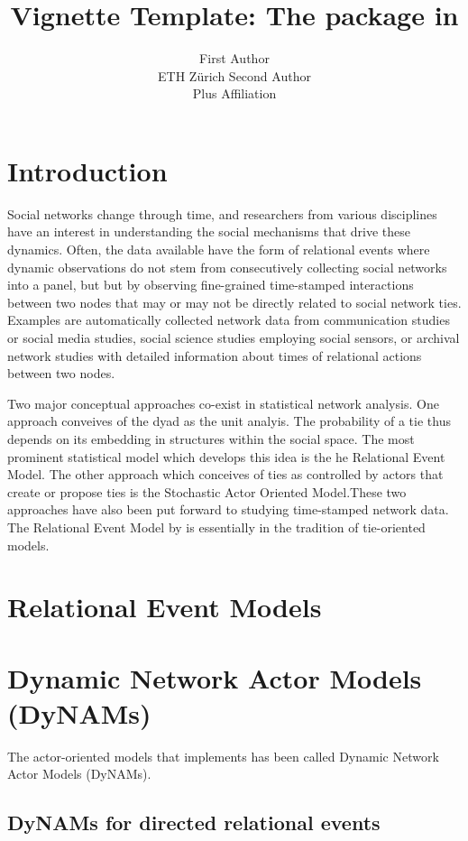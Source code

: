 \documentclass[article]{jss}
\author{First Author\\ETH Zürich
   \And Second Author\\Plus Affiliation}
\title{Vignette Template: The \pkg{goldfish} package in \proglang{R}}
\begin{document}


\justify
\section[Introduction]{Introduction} \label{sec:intro}


Social networks change through time, and researchers from various disciplines have an interest in understanding the social mechanisms that drive these dynamics. Often, the data available have the form of relational events where dynamic observations do not stem from consecutively collecting social networks into a panel, but but by observing fine-grained time-stamped interactions between two nodes that may or may not be directly related to social network ties. Examples are automatically collected network data from communication studies or social media studies, social science studies employing social sensors, or archival network studies with detailed information about times of relational actions between two nodes.

Two major conceptual approaches co-exist in statistical network analysis. One approach conveives of the dyad as the unit analyis. The probability of a tie thus depends on its embedding in structures within the social space. The most prominent statistical model which develops this idea is the he Relational Event Model. The other approach which conceives of ties as controlled by actors that create or propose ties is the Stochastic Actor Oriented Model.These two approaches have also been put forward to studying time-stamped network data. The Relational Event Model by \citet{Butts2008} is essentially in the tradition of tie-oriented models. 

\section[Relational Event Models]{Relational Event Models} \label{sec:REM}

\section[Dynamic Network Actor Models (DyNAMs)]{Dynamic Network Actor Models (DyNAMs)} \label{sec:DyNAMs}

The actor-oriented models that  implements has been called Dynamic Network Actor Models (DyNAMs).



\subsection[DyNAMs for directed relational events]{DyNAMs for directed relational events} \label{subsec:DyNAMs_relevts}
\end{document}

